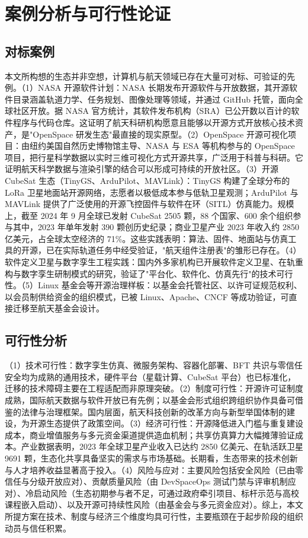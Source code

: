 \documentclass[UTF8,a4paper,zihao=-4]{ctexart}
\begin{document}
\section{案例分析与可行性论证}
\subsection{对标案例}
本文所构想的生态并非空想，计算机与航天领域已存在大量可对标、可验证的先例。（1）NASA 开源软件计划：NASA 长期发布开源软件与开放数据，其开源软件目录涵盖轨道力学、任务规划、图像处理等领域，并通过 GitHub 托管，面向全球社区开放\cite{nasa}。据 NASA 官方统计，其软件发布机构（SRA）已公开数以百计的软件程序与代码仓库。这证明了航天科研机构愿意且能够以开源方式开放核心技术资产，是"OpenSpace 研发生态"最直接的现实原型。（2）OpenSpace 开源可视化项目：由纽约美国自然历史博物馆主导、NASA 与 ESA 等机构参与的 OpenSpace 项目，把行星科学数据以实时三维可视化方式开源共享\cite{openspace}，广泛用于科普与科研。它证明航天科学数据与渲染引擎的结合可以形成可持续的开放社区。（3）开源 CubeSat 生态（TinyGS、ArduPilot、MAVLink）：TinyGS 构建了全球分布的 LoRa 卫星地面站开源网络\cite{tinygs}，志愿者以极低成本参与低轨卫星观测；ArduPilot 与 MAVLink 提供了广泛使用的开源飞控固件与软件在环（SITL）仿真能力\cite{ardupilot,mavlink}。规模上，截至 2024 年 9 月全球已发射 CubeSat 2505 颗，88 个国家、600 余个组织参与其中，2023 年单年发射 390 颗创历史纪录\cite{kulu2024}；商业卫星产业 2023 年收入约 2850 亿美元，占全球太空经济的 71\%\cite{sia2024}。这些实践表明：算法、固件、地面站与仿真工具的开源，已在实际轨道任务中经受验证，"航天组件注册表"的雏形已存在。（4）软件定义卫星与数字孪生工程实践：国内外多家机构已开展软件定义卫星、在轨重构与数字孪生研制模式的研究\cite{xufanjiang2023}，验证了"平台化、软件化、仿真先行"的技术可行性。（5）Linux 基金会等开源治理样板：以基金会托管社区、以许可证规范权利、以会员制供给资金的组织模式，已被 Linux、Apache、CNCF 等成功验证\cite{fogel2005}，可直接迁移至航天基金会设计。

\subsection{可行性分析}
（1）技术可行性：数字孪生仿真、微服务架构、容器化部署、BFT 共识与零信任安全均为成熟的通用技术，硬件平台（星载计算、CubeSat 平台）也已标准化，迁移的技术障碍主要在工程适配而非原理突破。（2）制度可行性：开源许可证制度成熟，国际航天数据与软件开放已有先例；以基金会形式组织跨组织协作具备可借鉴的法律与治理框架。国内层面，航天科技创新的改革方向与新型举国体制的建设，为开源生态提供了政策空间\cite{white2021}。（3）经济可行性：开源降低进入门槛与重复建设成本，商业增值服务与多元资金渠道提供造血机制；共享仿真算力大幅摊薄验证成本。产业数据表明，2023 年全球卫星产业收入已达约 2850 亿美元、在轨活跃卫星 9691 颗\cite{sia2024}，生态化共享具备坚实的需求与市场基础。长期看，生态带来的技术创新与人才培养收益显著高于投入。（4）风险与应对：主要风险包括安全风险（已由零信任与分级开放应对）、贡献质量风险（由 DevSpaceOps 测试门禁与评审机制应对）、冷启动风险（生态初期参与者不足，可通过政府牵引项目、标杆示范与高校课程嵌入启动）、以及开源可持续性风险（由基金会与多元资金应对）。综上，本文所提方案在技术、制度与经济三个维度均具可行性，主要瓶颈在于起步阶段的组织动员与信任积累。
\end{document}

